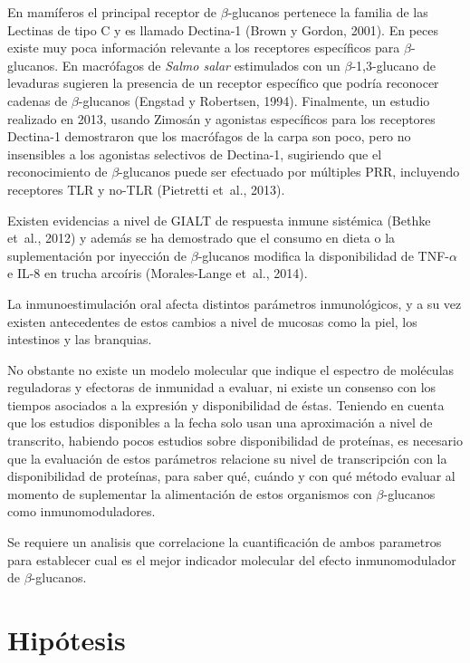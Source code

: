 \documentclass[12pt,letterpaper,oneside]{scrbook}
\begin{document}
En mamíferos el principal receptor de \(\beta\)-glucanos pertenece la
familia de las Lectinas de tipo C y es llamado Dectina-1 (Brown y
Gordon, 2001). En peces existe muy poca información relevante a los
receptores específicos para \(\beta\)-glucanos. En macrófagos de
\emph{Salmo salar} estimulados con un \(\beta\)-1,3-glucano de levaduras
sugieren la presencia de un receptor específico que podría reconocer
cadenas de \(\beta\)-glucanos (Engstad y Robertsen, 1994). Finalmente,
un estudio realizado en 2013, usando Zimosán y agonistas específicos
para los receptores Dectina-1 demostraron que los macrófagos de la carpa
son poco, pero no insensibles a los agonistas selectivos de Dectina-1,
sugiriendo que el reconocimiento de \(\beta\)-glucanos puede ser
efectuado por múltiples PRR, incluyendo receptores TLR y no-TLR
(Pietretti et~al., 2013).

Existen evidencias a nivel de GIALT de respuesta inmune sistémica
(Bethke et~al., 2012) y además se ha demostrado que el consumo en dieta
o la suplementación por inyección de \(\beta\)-glucanos modifica la
disponibilidad de TNF-\(\alpha\) e IL-8 en trucha arcoíris
(Morales-Lange et~al., 2014).

La inmunoestimulación oral afecta distintos parámetros inmunológicos, y
a su vez existen antecedentes de estos cambios a nivel de mucosas como
la piel, los intestinos y las branquias.

No obstante no existe un modelo molecular que indique el espectro de
moléculas reguladoras y efectoras de inmunidad a evaluar, ni existe un
consenso con los tiempos asociados a la expresión y disponibilidad de
éstas. Teniendo en cuenta que los estudios disponibles a la fecha solo
usan una aproximación a nivel de transcrito, habiendo pocos estudios
sobre disponibilidad de proteínas, es necesario que la evaluación de
estos parámetros relacione su nivel de transcripción con la
disponibilidad de proteínas, para saber qué, cuándo y con qué método
evaluar al momento de suplementar la alimentación de estos organismos
con \(\beta\)-glucanos como inmunomoduladores.

Se requiere un analisis que correlacione la cuantificación de ambos
parametros para establecer cual es el mejor indicador molecular del
efecto inmunomodulador de \(\beta\)-glucanos.

\chapter{Hipótesis}
\end{document}
